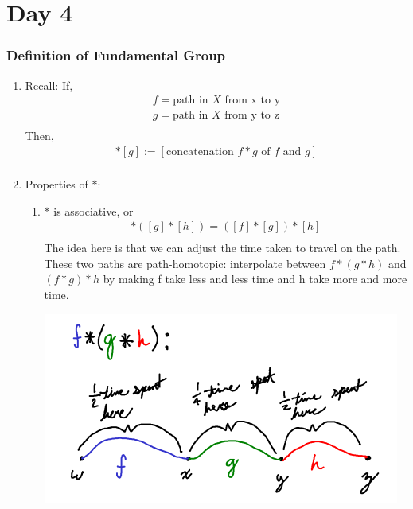 \section{Day 4}
    \subsubsection{Definition of Fundamental Group}
    \begin{enumerate}
        \item \underline{Recall:} If,
            \begin{align*}
                f=\text{path in $X$ from x to y}\\
                g=\text{path in $X$ from y to z}\\
            \end{align*}
            Then,
            \begin{align*}
                [f]*[g]:=[\text{concatenation $f*g$ of $f$ and $g$}]\\
            \end{align*}
        \item{Properties of $*$:}
            \begin{enumerate}
                \item $*$ is associative, or
                    \begin{align*}
                        [f]*([g]*[h])=([f]*[g])*[h]\\
                    \end{align*}
                    The idea here is that we can adjust the time taken to travel on the path.
                    These two paths are path-homotopic: interpolate between $f*(g*h)$ and
                    $(f*g)*h$ by making f take less and less time and h take more and more time.\\
            \begin{minipage}[c]{\linewidth}
                \begin{center}
                \includegraphics[]{images/association.png}

\end{center}
\end{minipage}
\end{enumerate}
\end{enumerate}
